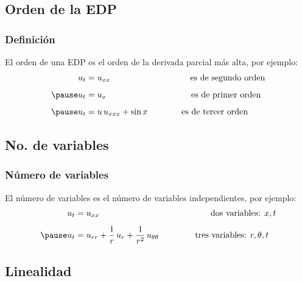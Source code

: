 \documentclass[12pt]{beamer}
\begin{document}
\subsection{Orden de la EDP}

\begin{frame}
\frametitle{Definición}
El orden de una EDP es el orden de la derivada parcial más alta, por ejemplo:
\pause
\begin{eqnarray*}
\begin{aligned}
u_{t} &= u_{xx} \hspace{3.3cm} \mbox{es de segundo orden} \\[0.5em] \pause
u_{t} &= u_{x} \hspace{3.5cm} \mbox{es de primer orden} \\[0.5em] \pause
u_{t} &= u \, u_{xxx} + \sin x \hspace{1.4cm} \mbox{es de tercer orden}
\end{aligned}
\end{eqnarray*}
\end{frame}

\subsection*{No. de variables}

\begin{frame}
\frametitle{Número de variables}
El número de variables es el número de variables independientes, por ejemplo:
\pause
\begin{eqnarray*}
\begin{aligned}
u_{t} &= u_{xx} \hspace{3cm} \hspace{1.61cm} \mbox{dos variables: } x, t \\[0.5em] \pause
u_{t} &= u_{rr} + \dfrac{1}{r} \, u_{r} + \dfrac{1}{r^{2}} \, u_{\theta \theta} \hspace{1.5cm} \mbox{tres variables: } r, \theta, t
\end{aligned}
\end{eqnarray*}
\end{frame}

\subsection*{Linealidad}
\end{document}
